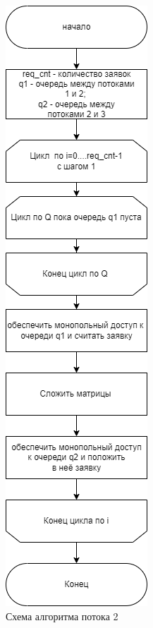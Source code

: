 \begin{figure}[h]
	\centering
	\includegraphics[height=0.85\textheight]{img/sum.png}
	\caption{Схема алгоритма потока 2}
	\label{fig:sum}
\end{figure}

